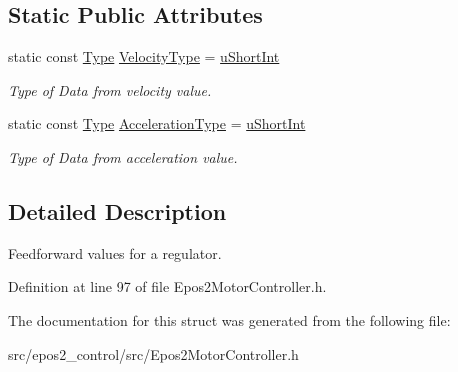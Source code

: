 \subsection*{Static Public Attributes}
\begin{DoxyCompactItemize}
\item 
\hypertarget{structEpos2MotorController_1_1feedForward_a1eb529f185ae958d1e6199c7ca4cb7ec}{static const \hyperlink{classEpos2MotorController_a5404c60266e24bb6c0ce60153ddcb774}{Type} \hyperlink{structEpos2MotorController_1_1feedForward_a1eb529f185ae958d1e6199c7ca4cb7ec}{Velocity\-Type} = \hyperlink{classEpos2MotorController_a5404c60266e24bb6c0ce60153ddcb774a2b4b83649b11351ce20e5f3db7dd19f6}{u\-Short\-Int}}\label{structEpos2MotorController_1_1feedForward_a1eb529f185ae958d1e6199c7ca4cb7ec}

\begin{DoxyCompactList}\small\item\em Type of Data from velocity value. \end{DoxyCompactList}\item 
\hypertarget{structEpos2MotorController_1_1feedForward_a55e9b797dfcb96f8b037ffe655c469c6}{static const \hyperlink{classEpos2MotorController_a5404c60266e24bb6c0ce60153ddcb774}{Type} \hyperlink{structEpos2MotorController_1_1feedForward_a55e9b797dfcb96f8b037ffe655c469c6}{Acceleration\-Type} = \hyperlink{classEpos2MotorController_a5404c60266e24bb6c0ce60153ddcb774a2b4b83649b11351ce20e5f3db7dd19f6}{u\-Short\-Int}}\label{structEpos2MotorController_1_1feedForward_a55e9b797dfcb96f8b037ffe655c469c6}

\begin{DoxyCompactList}\small\item\em Type of Data from acceleration value. \end{DoxyCompactList}\end{DoxyCompactItemize}


\subsection{Detailed Description}
Feedforward values for a regulator. 

Definition at line 97 of file Epos2\-Motor\-Controller.\-h.



The documentation for this struct was generated from the following file\-:\begin{DoxyCompactItemize}
\item 
src/epos2\-\_\-control/src/Epos2\-Motor\-Controller.\-h\end{DoxyCompactItemize}
